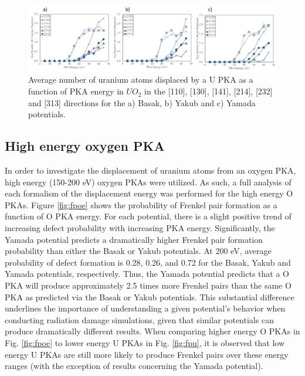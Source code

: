 \documentclass[8pt]{article}   	%
\begin{document}
\begin{figure}[h]
 \centering
 \includegraphics[width=1.0\textwidth]{dispU_U.png}
 \caption{Average number of uranium atoms displaced by a U PKA as a function of PKA energy in $UO_2$ in the [110], [130], [141], [214], [232] and [313] directions for the a) Basak, b) Yakub and c) Yamada potentials.   }
 \label{fig:dispuu}
\end{figure}

\FloatBarrier

\subsection{High energy oxygen PKA}
\hspace{5mm}

In order to investigate the displacement of uranium atoms from an oxygen PKA, high energy (150-200 eV) oxygen PKAs were utilized. As such, a full analysis of each formalism of the displacement energy was performed for the high energy O PKAs. Figure \ref{fig:fpoe} shows the probability of Frenkel pair formation as a function of O PKA energy. For each potential, there is a slight positive trend of increasing defect probability with increasing PKA energy. Significantly, the Yamada potential predicts a dramatically higher Frenkel pair formation probability than either the Basak or Yakub potentials. At 200 eV, average probability of defect formation is 0.28, 0.26, and 0.72 for the Basak, Yakub and Yamada potentials, respectively. Thus, the Yamada potential predicts that a O PKA will produce approximately 2.5 times more Frenkel pairs than the same O PKA as predicted via the Basak or Yakub potentials. This substantial difference underlines the importance of understanding a given potential's behavior when conducting radiation damage simulations, given that similar potentials can produce dramatically different results. When comparing higher energy O PKAs in Fig. \ref{fig:fpoe} to lower energy U PKAs in Fig. \ref{fig:fpu}, it is observed that low energy U PKAs are still more likely to produce Frenkel pairs over these energy ranges (with the exception of results concerning the Yamada potential).
\end{document}
